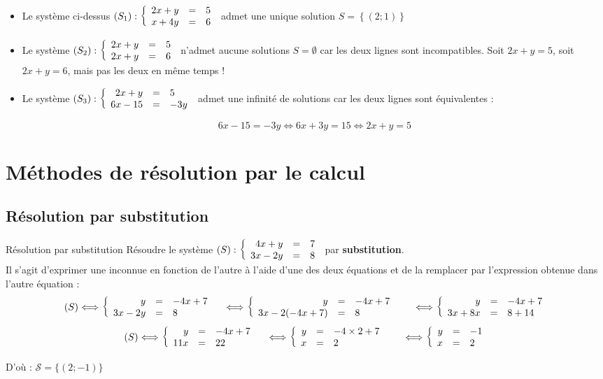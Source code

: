 \documentclass[10pt,a4paper,openany,twoside, eleve]{book}
\begin{document}
\begin{ex}{}{}
   \begin{itemize}
      \item Le système ci-dessus $(S_1) : \left\{\begin{array}{rcl} 2x+y&=&5 \\ x+4y&=&6 \end{array}\right.$ admet une unique solution $S=\left\{(2;1)\right\}$
      \item Le système $(S_2) : \left\{\begin{array}{rcl} 2x+y&=&5 \\ 2x+y&=&6 \end{array}\right.$ n'admet aucune solutions $S=\emptyset$ car les deux lignes sont incompatibles. Soit $2x+y=5$, soit $2x+y=6$, mais pas les deux en même temps !
      \item Le système $(S_3) : \left\{\begin{array}{rcl} 2x+y&=&5 \\ 6x-15&=&-3y \end{array}\right.$ admet une infinité de solutions car les deux lignes sont équivalentes :

      $$6x-15=-3y \iff 6x+3y=15 \iff 2x+y=5$$
   \end{itemize}
\end{ex}

\vspace{-5mm}
\section{Méthodes de résolution par le calcul}
\vspace{-3mm}
\subsection{Résolution par substitution}

\begin{methode}{Résolution par substitution}{}
 Résoudre le système $(S):\left\{\begin{array}{rcl} 4x+y&=&7 \\ 3x-2y&=&8 \end{array}\right.$ par \textbf{substitution}. \\

\noindent Il s'agit d'exprimer une inconnue en fonction de l'autre à l'aide d'une des deux équations et de la remplacer par l'expression obtenue dans l'autre équation : \\

\begin{align*}
   (S)
   &\Longleftrightarrow \left\{\begin{array}{rcl} y&=&-4x+7 \\ 3x-2y&=&8 \end{array}\right.
   &&\Longleftrightarrow \left\{\begin{array}{rcl} y&=&-4x+7 \\ 3x-2(-4x+7)&=&8 \end{array}\right.
   &&&\Longleftrightarrow \left\{\begin{array}{rcl} y&=&-4x+7 \\ 3x+8x&=&8+14 \end{array}\right.\\
\end{align*}
\begin{align*}
   (S)
   &\Longleftrightarrow \left\{\begin{array}{rcl} y&=&-4x+7 \\ 11x&=&22 \end{array}\right.
   &&\Longleftrightarrow \left\{\begin{array}{rcl} y&=&-4\times 2+7 \\ x&=&2 \end{array}\right.
   &&&\Longleftrightarrow \left\{\begin{array}{rcl} y&=&-1 \\ x&=&2 \end{array}\right. \\
\end{align*}

\noindent D'où : $\mathcal{S}=\{(2;-1)\}$ \\
\end{methode}
\end{document}

